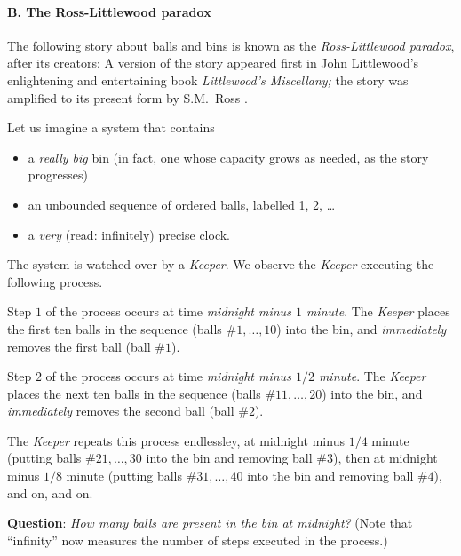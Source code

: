 \paragraph{\small\sf B. The Ross-Littlewood paradox}

The following story about balls and bins is known as the {\it
  Ross-Littlewood paradox}, after its creators: A version of the story
appeared first in John Littlewood's enlightening and entertaining book
{\it Littlewood's Miscellany;} \cite{Littlewood-misc}
 the story was amplified to its present
form by S.M.~Ross \cite{Ross76}. 

Let us imagine a system that contains
\begin{itemize}
\item
a {\em really big} bin (in fact, one whose capacity grows as needed,
as the story progresses)
\item
an unbounded sequence of ordered balls, labelled 1, 2, \ldots
\item
a {\em very} (read: infinitely) precise clock.
\end{itemize}
The system is watched over by a {\it Keeper}.  We observe
the {\it Keeper} executing the following process.

Step $1$ of the process occurs at time {\em midnight minus $1$
  minute}.  The {\it Keeper} places the first ten balls in the
sequence (balls \#$1, \ldots, 10$) into the bin, and {\em immediately}
removes the first ball (ball \#$1$).

Step $2$ of the process occurs at time {\em midnight minus $1/2$
  minute}.  The {\it Keeper} places the next ten balls in the sequence
(balls \#$11, \ldots, 20$) into the bin, and {\em immediately} removes
the second ball (ball \#$2$).

The {\it Keeper} repeats this process endlessley, at midnight minus
$1/4$ minute (putting balls \#$21, \ldots, 30$ into the bin and
removing ball \#$3$), then at midnight minus $1/8$ minute (putting
balls \#$31, \ldots, 40$ into the bin and removing ball \#$4$), and
on, and on.

\noindent
{\bf Question}: {\it How many balls are present in the bin at
  midnight?}  (Note that ``infinity'' now measures the number of steps
executed in the process.)

